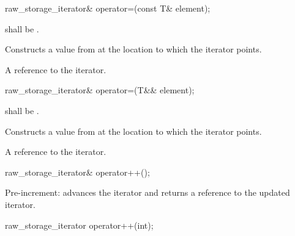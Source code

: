 \begin{itemdescr}
\pnum
\returns
{}
\end{itemdescr}

\begin{itemdecl}
raw_storage_iterator& operator=(const T& element);
\end{itemdecl}

\begin{itemdescr}
\pnum
\requires
{} shall be .

\pnum
\effects
Constructs a value from  at the location to which the iterator points.

\pnum
\returns
A reference to the iterator.
\end{itemdescr}

\begin{itemdecl}
raw_storage_iterator& operator=(T&& element);
\end{itemdecl}

\begin{itemdescr}
\pnum
\requires
{} shall be .

\pnum
\effects
Constructs a value from  at the location to which
the iterator points.

\pnum
\returns
A reference to the iterator.
\end{itemdescr}

\begin{itemdecl}
raw_storage_iterator& operator++();
\end{itemdecl}

\begin{itemdescr}
\pnum
\effects
Pre-increment:  advances the iterator and returns a reference to the updated iterator.
\end{itemdescr}

\begin{itemdecl}
raw_storage_iterator operator++(int);
\end{itemdecl}

